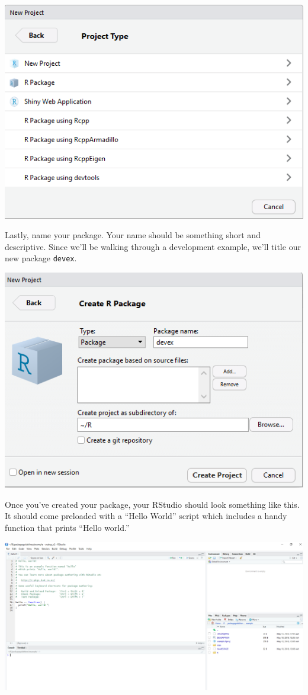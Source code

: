 \documentclass[
]{book}
\begin{document}
\includegraphics{images/packageSS/createproj2.PNG}

Lastly, name your package. Your name should be something short and descriptive. Since we'll be walking through a development example, we'll title our new package \texttt{devex}.

\includegraphics{images/packageSS/createproj3.PNG}

Once you've created your package, your RStudio should look something like this. It should come preloaded with a ``Hello World'' script which includes a handy function that prints ``Hello world.''

\includegraphics{images/packageSS/projectinit.PNG}
\end{document}

